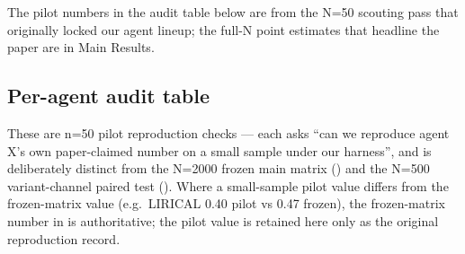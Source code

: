 The pilot numbers in the audit table below are from the N=50 scouting
pass that originally locked our agent lineup; the full-N point
estimates that headline the paper are in  Main Results.

\subsection{Per-agent audit table}\label{per-agent-audit-table}

These are n=50 pilot reproduction checks --- each asks ``can we reproduce agent X's own paper-claimed number on a small sample under our harness'', and is deliberately distinct from the N=2000 frozen main matrix () and the N=500 variant-channel paired test (). Where a small-sample pilot value differs from the frozen-matrix value (e.g.~LIRICAL 0.40 pilot vs 0.47 frozen), the frozen-matrix number in  is authoritative; the pilot value is retained here only as the original reproduction record.

